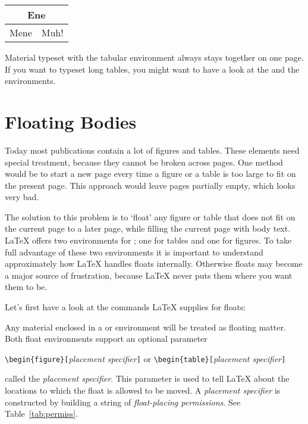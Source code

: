 \begin{example}
\begin{tabular}{|c|c|}
\hline
\multicolumn{2}{|c|}{Ene} \\
\hline
Mene & Muh! \\
\hline
\end{tabular}
\end{example}

Material typeset with the tabular environment always stays together on
one page. If you want to typeset long tables, you might want to have a
look at the  and the  environments.

\section{Floating Bodies}
Today most publications contain a lot of figures and tables. These
elements need special treatment, because they cannot be broken across
pages.  One method would be to start a new page every time a figure or
a table is too large to fit on the present page. This approach would
leave pages partially empty, which looks very bad.

The solution to this problem is to `float' any figure or table that
does not fit on the current page to a later page, while filling the
current page with body text. \LaTeX{} offers two environments for
; one for tables and  one for figures.  To
take full advantage of these two environments it is important to
understand approximately how \LaTeX{} handles floats internally.
Otherwise floats may become a major source of frustration, because
\LaTeX{} never puts them where you want them to be.

\bigskip
Let's first have a look at the commands \LaTeX{} supplies
for floats:

Any material enclosed in a  or  environment will
be treated as floating matter. Both float environments support an optional
parameter
\begin{lscommand}
\verb|\begin{figure}[|\emph{placement specifier}\verb|]| or
\verb|\begin{table}[|\emph{placement specifier}\verb|]|
\end{lscommand}
\noindent called the \emph{placement specifier}. This parameter
is used to tell \LaTeX{} about the locations to which the float
is allowed to be moved.  A \emph{placement specifier} is constructed by building a string
of \emph{float-placing permissions}. See Table~\ref{tab:permiss}.

